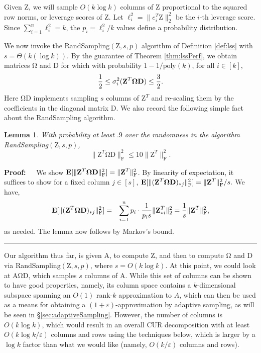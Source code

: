 \documentclass[11pt]{article}
\newcommand{\FNormS}[1]{\mbox{}\|#1\|_\mathrm{F}^2}
\newtheorem{lemma}[theorem]{Lemma}
\newenvironment{proof}{\begin{trivlist} \item {\bf Proof:~~}}
  {\qed\end{trivlist}}
\newcommand{\mat}[1]{{\ensuremath{\bm{\mathrm{#1}}}}}
\def\matA{\mat{A}}
\def\matD{\mat{D}}
\def\matZ{\mat{Z}}
\def\frac#1#2{{#1\over #2}}
\def\qed{\hfill\rule{2mm}{2mm}}
\newcommand{\eps}{\varepsilon}
\newcommand{\poly}{{\mathrm{poly}}}
\begin{document}
Given $\matZ$, we will sample $O(k \log k)$ columns of $\matZ$ proportional to the squared row norms, or leverage scores of $\matZ$.
Let $\ell_i^2 = \|e_i^T\matZ\|_2^2$ be the $i$-th leverage score. 
Since $\sum_{i=1}^n \ell_i^2 = k$, the $p_i = \ell_i^2/k$ values
define a probability distribution. 

We now invoke the {\textsc RandSampling}$(\matZ, s, p)$ algorithm of
Definition \ref{def:lss} with $s = \Theta(k (\log k))$. By the guarantee of Theorem \ref{thm:lssPerf},
we obtain matrices $\mat\Omega$ and $\matD$ for which with probability $1-1/\poly(k)$, for all $i \in [k]$,
\begin{eqnarray}\label{eqn:rank1}
\frac{1}{2} \leq \sigma_i^2 (\matZ^T \mat\Omega \matD) \leq \frac{3}{2}.
\end{eqnarray}
Here $\mat\Omega \matD$ implements sampling $s$ columns of $\matZ^T$ and re-scaling them by the coefficients
in the diagonal matrix $\matD$. We also record the following simple fact about the {\textsc RandSampling}
algorithm.
\begin{lemma}\label{lem:FrobLSS}
With probability at least $.9$ over the randomness in the algorithm {\textsc RandSampling}$(\matZ, s, p)$,
$$\FNormS{\matZ^T \mat\Omega \matD} \leq 10\FNormS{\matZ^T}.$$
\end{lemma}
\begin{proof}
We show ${\bf E}[\FNormS{\matZ^T \mat\Omega \matD}] = \FNormS{\matZ^T}$. 
By linearity of expectation, it suffices to show for a fixed column $j \in [s]$,
${\bf E}[\FNormS{(\matZ^T \mat\Omega \matD)_{*j}}] = \FNormS{\matZ^T}/s.$ We have, 
\begin{eqnarray*}
{\bf E}[\FNormS{(\matZ^T \mat\Omega \matD)_{*j}}] & = & \sum_{i=1}^n p_i \cdot \frac{1}{p_i s} \|\matZ^T_{*i}\|_2^2 = \frac{1}{s} \FNormS{\matZ^T},
\end{eqnarray*}
as needed. The lemma now follows by Markov's bound. 
\end{proof}

Our algorithm thus far, is given $\matA$, to compute $\matZ$, and then to compute $\mat\Omega$ and $\matD$ via
{\textsc RandSampling}$(\matZ, s, p)$, 
where $s = O(k \log k)$. At this point, we could look at $\matA \mat\Omega \matD$, which
samples $s$ columns of $\matA$. While this set of columns can be shown to have good properties, namely, 
its column space contains a $k$-dimensional subspace spanning an $O(1)$ rank-$k$ approximation to $A$, which can then
be used as a means for obtaining a $(1+\eps)$-approximation by adaptive sampling, as will be seen in 
\S\ref{sec:adaptiveSampling}. However, the number of columns is $O(k \log k)$, which would result in an overall
CUR decomposition with at least $O(k \log k / \eps)$ columns and rows using the techniques below, 
which is larger by a $\log k$ factor than what we would like (namely, $O(k/\eps)$ columns and rows). 
\end{document}
